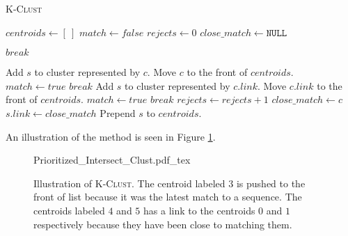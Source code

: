 \begin{algorithm}[H]
  \caption{\textsc{K-Clust}}
  \label{alg:k-clust}
  \begin{algorithmic}[1]
    \Statex
      \State $centroids \gets [~]$ 
        \State $match \gets false$
        \State $rejects \gets 0$
        \State $close\_match \gets \mathtt{NULL}$

            \State $break$
          \EndIf

          \State
              \State Add $s$ to cluster represented by $c$.
              \State Move $c$ to the front of $centroids$.
              \State $match \gets true$
              \State $break$
            \EndIf
            \State
              \State Add $s$ to cluster represented by $c.link$.
              \State Move $c.link$ to the front of $centroids$.
              \State $match \gets true$
              \State $break$
            \EndIf
            \State $rejects \gets rejects + 1$
            \State $close\_match \gets c$
          \EndIf
        \EndFor
        \State
          
            \State $s.link \gets close\_match$
          \EndIf
          \State Prepend $s$ to $centroids$.
        \EndIf
      \EndFor
    \EndFunction
  \end{algorithmic}
\end{algorithm}

An illustration of the method is seen in Figure \ref{fig:k-clust}.

\begin{figure}[h!]
  \def\svgwidth{\columnwidth}
  {Prioritized_Intersect_Clust.pdf_tex}
  \caption{Illustration of \textsc{K-Clust}. The centroid labeled
    $3$ is pushed to the front of list because it was the latest match to a
    sequence. The centroids labeled $4$ and $5$ has a link to the centroids $0$
    and $1$ respectively because they have been close to matching them.}
  \label{fig:k-clust}
\end{figure}


